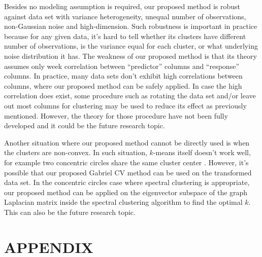 \documentclass[12pt]{article}
\begin{document}
Besides no modeling assumption is required, our proposed method is robust against data set 
with variance heterogeneity, unequal number of observations, non-Gaussian noise and high-dimension. 
Such robustness is important in practice because for any given data, it's hard to tell whether
its clusters have different number of observations, is the variance equal for each cluster,
or what underlying noise distribution it has. The weakness of our proposed method is 
that its theory assumes only week correlation between ``predictor'' columns and ``response'' 
columns. In practice, many data sets don't exhibit high correlations between columns, where
our proposed method can be safely applied. In case the high correlation does exist, some procedure
such as rotating the data set and/or leave out most columns for clustering may be used to
reduce its effect as previously mentioned. However, the theory for those procedure have not
been fully developed and it could be the future research topic. 

Another situation where our proposed method cannot be directly used is when the clusters 
are non-convex. In such situation, $k$-means itself doesn't work well, for example two 
concentric circles share the same cluster center \citep{hastie2009elements}. However, it's 
possible that our proposed Gabriel CV method can be used on the transformed data set. In the
concentric circles case where spectral clustering is appropriate, our proposed method can be applied 
on the eigenvector subspace of the graph Laplacian matrix inside the spectral clustering algorithm
to find the optimal $k$. This can also be the future research topic. 

\clearpage

\section*{\textbf{APPENDIX}}
\appendix
\end{document}
